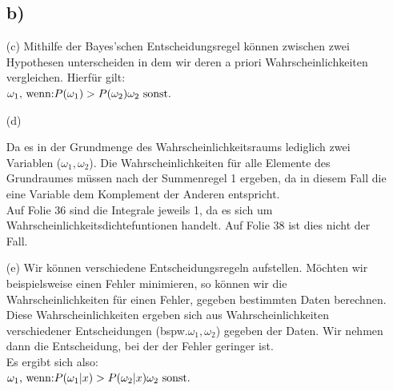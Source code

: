 \documentclass[a4paper]{scrartcl}
\begin{document}
\begin{itemize}

\subsection*{b)}













\item[(c)]
Mithilfe der Bayes'schen Entscheidungsregel können zwischen zwei Hypothesen unterscheiden in dem wir deren a priori Wahrscheinlichkeiten vergleichen. Hierfür gilt:\\
$
\omega_1 \text{, wenn:} P(\omega_1) > P(\omega_2)\\
\omega_2 \text{ sonst.}
$



\item[(d)]


Da es in der Grundmenge des Wahrscheinlichkeitsraums lediglich zwei Variablen ($\omega_1, \omega_2$). Die Wahrscheinlichkeiten für alle Elemente des Grundraumes müssen nach der Summenregel 1 ergeben, da 
in diesem Fall die eine Variable dem Komplement der Anderen entspricht.
\\
Auf Folie 36 sind die Integrale jeweils 1, da es sich um Wahrscheinlichkeitsdichtefuntionen handelt. Auf Folie 38 ist dies nicht der Fall.


\item[(e)] Wir können verschiedene Entscheidungsregeln aufstellen. Möchten wir beispielsweise einen Fehler minimieren, so können wir die Wahrscheinlichkeiten für einen Fehler, gegeben bestimmten Daten berechnen.\\
Diese Wahrscheinlichkeiten ergeben sich aus Wahrscheinlichkeiten verschiedener Entscheidungen (bspw.$\omega_1, \omega_2$) gegeben der Daten. Wir nehmen dann die Entscheidung, bei der der Fehler geringer ist.\\
Es ergibt sich also:\\
$
\omega_1 \text{, wenn:} P(\omega_1|x) > P(\omega_2|x)\\
\omega_2 \text{ sonst.}
$\\


\end{itemize}
\end{document}
